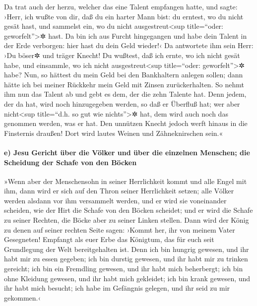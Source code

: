  Da trat auch der herzu, welcher das eine Talent
empfangen hatte, und sagte: ›Herr, ich wußte von dir, daß du ein harter
Mann bist: du erntest, wo du nicht gesät hast, und sammelst ein, wo du
nicht ausgestreut\textless sup title=``oder: geworfelt''\textgreater✲
hast.  Da bin ich aus Furcht hingegangen und habe dein
Talent in der Erde verborgen: hier hast du dein Geld wieder!‹
 Da antwortete ihm sein Herr: ›Du böser✲ und träger
Knecht! Du wußtest, daß ich ernte, wo ich nicht gesät habe, und
einsammle, wo ich nicht ausgestreut\textless sup title=``oder:
geworfelt''\textgreater✲ habe?  Nun, so hättest du mein
Geld bei den Bankhaltern anlegen sollen; dann hätte ich bei meiner
Rückkehr mein Geld mit Zinsen zurückerhalten.  So nehmt
ihm nun das Talent ab und gebt es dem, der die zehn Talente hat.
 Denn jedem, der da hat, wird noch hinzugegeben werden,
so daß er Überfluß hat; wer aber nicht\textless sup title=``d.h. so gut
wie nichts''\textgreater✲ hat, dem wird auch noch das genommen werden,
was er hat.  Den unnützen Knecht jedoch werft hinaus in
die Finsternis draußen! Dort wird lautes Weinen und Zähneknirschen
sein.«

\hypertarget{e-jesu-gericht-uxfcber-die-vuxf6lker-und-uxfcber-die-einzelnen-menschen-die-scheidung-der-schafe-von-den-buxf6cken}{%
\paragraph{e) Jesu Gericht über die Völker und über die einzelnen
Menschen; die Scheidung der Schafe von den
Böcken}\label{e-jesu-gericht-uxfcber-die-vuxf6lker-und-uxfcber-die-einzelnen-menschen-die-scheidung-der-schafe-von-den-buxf6cken}}

 »Wenn aber der Menschensohn in seiner Herrlichkeit kommt
und alle Engel mit ihm, dann wird er sich auf den Thron seiner
Herrlichkeit setzen;  alle Völker werden alsdann vor ihm
versammelt werden, und er wird sie voneinander scheiden, wie der Hirt
die Schafe von den Böcken scheidet;  und er wird die
Schafe zu seiner Rechten, die Böcke aber zu seiner Linken stellen.
 Dann wird der König zu denen auf seiner rechten Seite
sagen: ›Kommt her, ihr von meinem Vater Gesegneten! Empfangt als euer
Erbe das Königtum, das für euch seit Grundlegung der Welt bereitgehalten
ist.  Denn ich bin hungrig gewesen, und ihr habt mir zu
essen gegeben; ich bin durstig gewesen, und ihr habt mir zu trinken
gereicht; ich bin ein Fremdling gewesen, und ihr habt mich beherbergt;
 ich bin ohne Kleidung gewesen, und ihr habt mich
gekleidet; ich bin krank gewesen, und ihr habt mich besucht; ich habe im
Gefängnis gelegen, und ihr seid zu mir gekommen.‹

